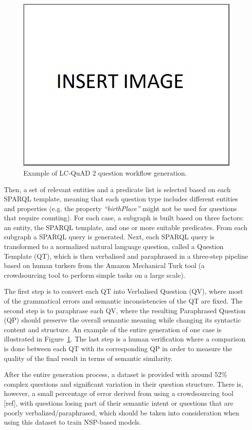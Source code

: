 \begin{figure}[!h]
    \centering
    \includegraphics[scale=.45]{imagenes/insertImage.png}
    \caption{Example of LC-QuAD 2 question workflow generation.}
    \label{fig:lcquad2Pipeline}
\end{figure}

Then, a set of relevant entities and a predicate list is selected based on each SPARQL template, 
meaning that each question type includes different entities and properties (e.g. the property 
\textit{“birthPlace”} might not be used for questions that require counting). For each case, a 
subgraph is built based on three factors: an entity, the SPARQL template, and one or more 
suitable predicates. From each subgraph a SPARQL query is generated. Next, each SPARQL query is 
transformed to a normalized natural language question, called a Question Template (QT), which is 
then verbalised and paraphrased in a three-step pipeline based on human turkers from the Amazon 
Mechanical Turk tool (a crowdsourcing tool to perform simple tasks on a large scale). 

The first step is to convert each QT into Verbalised Question (QV), where most of the 
grammatical errors and semantic inconsistencies of the QT are fixed. The second step is to 
paraphrase each QV, where the resulting Paraphrased Question (QP) should preserve the overall 
semantic meaning while changing its syntactic content and structure. An example of the entire 
generation of one case is illustrated in Figure~\ref{fig:lcquad2Pipeline}. The last step is a 
human verification where a comparison is done between each QT with its corresponding QP in 
order to measure the quality of the final result in terms of semantic similarity.

After the entire generation process, a dataset is provided with around 52\% complex questions 
and significant variation in their  question structure. There is, however, a small percentage 
of error derived from using a crowdsourcing tool [ref], with questions losing part of their 
semantic intent or questions that are poorly verbalized/paraphrased, which should be taken into 
consideration when using this dataset to train NSP-based models. 
